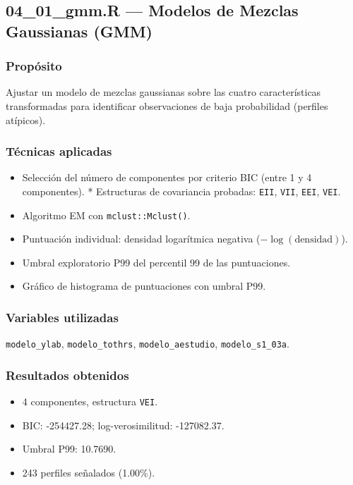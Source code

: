 \documentclass[12pt,a4paper]{article}
\begin{document}
\subsection{04\_01\_gmm.R --- Modelos de Mezclas Gaussianas (GMM)}

\subsubsection{Propósito}
Ajustar un modelo de mezclas gaussianas sobre las cuatro características transformadas para identificar observaciones de baja probabilidad (perfiles atípicos).

\subsubsection{Técnicas aplicadas}
\begin{itemize}
  \item Selección del número de componentes por criterio BIC (entre 1 y 4 componentes).
  * Estructuras de covariancia probadas: \texttt{EII}, \texttt{VII}, \texttt{EEI}, \texttt{VEI}.
  \item Algoritmo EM con \texttt{mclust::Mclust()}.
  \item Puntuación individual: densidad logarítmica negativa ($-\log(\text{densidad})$).
  \item Umbral exploratorio P99 del percentil 99 de las puntuaciones.
  \item Gráfico de histograma de puntuaciones con umbral P99.
\end{itemize}

\subsubsection{Variables utilizadas}
\texttt{modelo\_ylab}, \texttt{modelo\_tothrs}, \texttt{modelo\_aestudio}, \texttt{modelo\_s1\_03a}.

\subsubsection{Resultados obtenidos}
\begin{itemize}
  \item 4 componentes, estructura \texttt{VEI}.
  \item BIC: -254427.28; log-verosimilitud: -127082.37.
  \item Umbral P99: 10.7690.
  \item 243 perfiles señalados (1.00\%).
\end{itemize}
\end{document}
